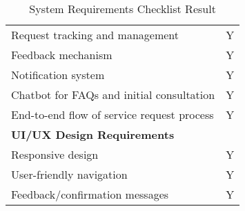 \begin{table}[ht]
\begin{tabular}{|p{10cm}|c|}
		Request tracking and management & Y \\
		Feedback mechanism & Y \\
		Notification system & Y \\
		Chatbot for FAQs and initial consultation & Y \\
		End-to-end flow of service request process & Y \\
		\hline
		\multicolumn{2}{|l|}{\textbf{UI/UX Design Requirements}} \\
		\hline
		Responsive design & Y \\
		User-friendly navigation & Y \\
		Feedback/confirmation messages & Y \\
		\hline
	\end{tabular}
	\caption{System Requirements Checklist Result}
	\label{tab:summary_results}
\end{table}